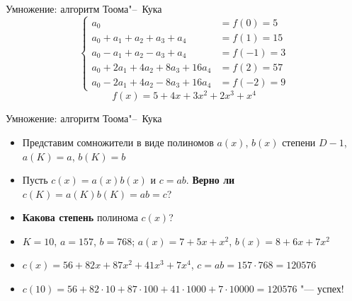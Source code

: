 \documentclass{ca-slides}
\begin{document}
\begin{canvasframe}{Умножение: алгоритм Тоома"--~Кука}
  \[\left\{\begin{aligned}
    a_0 &= f(0) = 5\\
    a_0 + a_1 + a_2 + a_3 + a_4 &= f(1) = 15\\
    a_0 - a_1 + a_2 - a_3 + a_4 &= f(-1) = 3\\
    a_0 + 2a_1 + 4a_2 + 8a_3 + 16a_4 &= f(2) = 57\\
    a_0 - 2a_1 + 4a_2 - 8a_3 + 16a_4 &= f(-2) = 9
  \end{aligned}\right.\]
  \[f(x) = 5 + 4x + 3x^2 + 2x^3 + x^4\]
  \penspace[0.15\textheight]
\end{canvasframe}

\begin{canvasframe}[shrink=16]{Умножение: алгоритм Тоома"--~Кука}
  \begin{itemize}
    \item Представим сомножители в виде полиномов $a(x)$, $b(x)$ степени $D-1$, $a(K) = a$, $b(K) = b$
    \item Пусть $c(x) = a(x) b(x)$ и $c = ab$. \textbf{Верно ли} $c(K) = a(K) b(K) = ab = c$?
    \item \textbf{Какова степень} полинома $c(x)$?
    \item $K = 10$, $a = 157$, $b = 768$; $a(x) = 7 + 5x + x^2$, $b(x) = 8 + 6x + 7x^2$
    \item $c(x) = 56 + 82x + 87x^2 + 41x^3 + 7x^4$, \quad $c = ab = 157 \cdot 768 = 120576$
    \item $c(10) = 56 + 82 \cdot 10 + 87 \cdot 100 + 41 \cdot 1000 + 7 \cdot 10000 = 120576$ "--- успех!
  \end{itemize}
\end{canvasframe}
\end{document}
